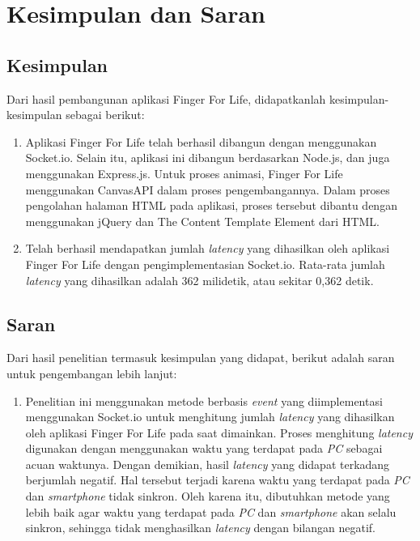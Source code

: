 \chapter{Kesimpulan dan Saran}
\label{chap:kesdansaran}

\section{Kesimpulan}
\label{sec:kesimpulan}
Dari hasil pembangunan aplikasi Finger For Life, didapatkanlah kesimpulan-kesimpulan sebagai berikut:

\begin{enumerate}
	\item Aplikasi Finger For Life telah berhasil dibangun dengan menggunakan Socket.io. Selain itu, aplikasi ini dibangun berdasarkan Node.js, dan juga menggunakan Express.js. Untuk proses animasi, Finger For Life menggunakan CanvasAPI dalam proses pengembangannya. Dalam proses pengolahan halaman HTML pada aplikasi, proses tersebut dibantu dengan menggunakan jQuery dan The Content Template Element dari HTML.
	
	\item Telah berhasil mendapatkan jumlah \textit{latency} yang dihasilkan oleh aplikasi Finger For Life dengan pengimplementasian Socket.io. Rata-rata jumlah \textit{latency} yang dihasilkan adalah 362 milidetik, atau sekitar 0,362 detik.
\end{enumerate}

\section{Saran}
\label{sec:saran}

Dari hasil penelitian termasuk kesimpulan yang didapat, berikut adalah saran untuk pengembangan lebih lanjut:

\begin{enumerate}
	\item Penelitian ini menggunakan metode berbasis \textit{event} yang diimplementasi menggunakan Socket.io untuk menghitung jumlah \textit{latency} yang dihasilkan oleh aplikasi Finger For Life pada saat dimainkan. Proses menghitung \textit{latency} digunakan dengan menggunakan waktu yang terdapat pada \textit{PC} sebagai acuan waktunya. Dengan demikian, hasil \textit{latency} yang didapat terkadang berjumlah negatif. Hal tersebut terjadi karena waktu yang terdapat pada \textit{PC} dan \textit{smartphone} tidak sinkron. Oleh karena itu, dibutuhkan metode yang lebih baik agar waktu yang terdapat pada \textit{PC} dan \textit{smartphone} akan selalu sinkron, sehingga tidak menghasilkan \textit{latency} dengan bilangan negatif.
\end{enumerate}
